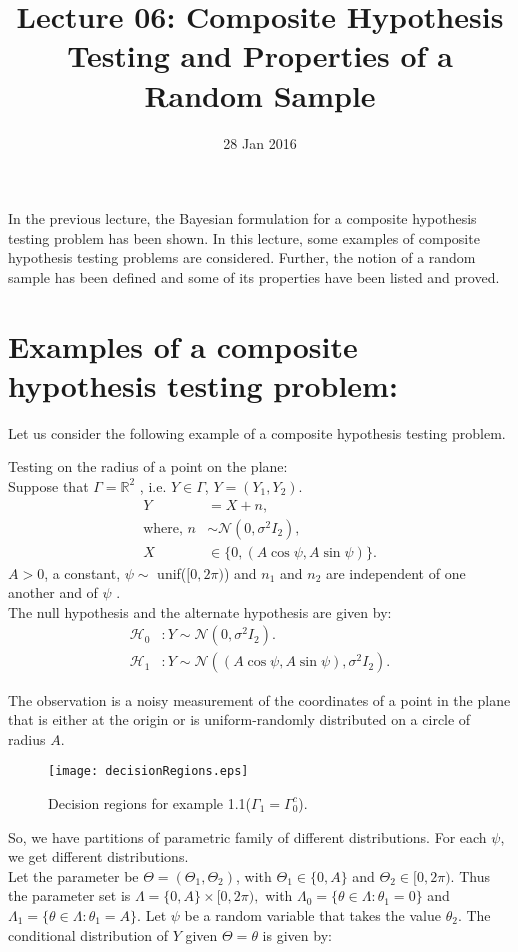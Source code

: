 \documentclass[a4paper,english,12pt]{article}
\title{Lecture 06: Composite Hypothesis Testing and Properties of a Random Sample}
\date{28 Jan 2016}
\author{}
\begin{document}
\maketitle
In the previous lecture, the Bayesian formulation for a composite hypothesis testing problem has been shown. In this lecture, some examples of composite hypothesis testing problems are considered. Further, the notion of a random sample has been defined and some of its properties have been listed and proved.

\section{Examples of a composite hypothesis testing problem:}
Let us consider the following example of a composite hypothesis testing problem.

\begin{exmp}
Testing on the radius of a point on the plane:\\
Suppose that $\Gamma = {\mathbb{R}}^2$ , i.e. $Y \in \Gamma$, $Y = (Y_1,Y_2).$
\begin{align*}
Y &= X + n,\\
\text{where, }
n &\sim \mathcal{N}(0,\sigma^2I_2),\nonumber\\
X &\in \{0,(A\cos\psi,A\sin\psi)\}.\nonumber
\end{align*}
$A > 0$, a constant, $\psi \sim$ unif($[0,2\pi)$) and $n_1$ and $n_2$ are independent of one another and of $\psi$ .\\

The null hypothesis and the alternate hypothesis are given by:
\begin{align*}
\mathcal{H}_0 &: Y \sim \mathcal{N}(0,\sigma^2I_2).\\
\mathcal{H}_1 &: Y \sim \mathcal{N}((A\cos\psi,A\sin\psi),\sigma^2I_2).
\end{align*}

The observation is a noisy measurement of the coordinates of a point in the plane that is either at the origin or is uniform-randomly distributed on a circle of radius $A$.

\begin{figure}
\centering
\texttt{[image: decisionRegions.eps]}
\caption{Decision regions for example 1.1($\Gamma_1 = \Gamma_0^c$).}
\label{fig: example 1.1}
\end{figure}

So, we have partitions of parametric family of different distributions.
For each $\psi$, we get different distributions.\\
Let the parameter be $\Theta = (\Theta_1,\Theta_2)$, with $\Theta_1 \in \{0,A\}$ and $\Theta_2 \in [0,2\pi)$. Thus the parameter set is $\Lambda = \{0,A\}\times [0,2\pi),$
with $\Lambda_0 = \{\theta \in \Lambda : \theta_1 = 0\}$ and $\Lambda_1 = \{\theta \in \Lambda : \theta_1 = A\}$. Let $\psi$ be a random variable that takes the value $\theta_2$. The conditional distribution of $Y$ given $\Theta = \theta$ is given by:\\


\end{exmp}
\end{document}
